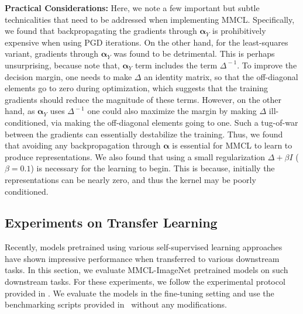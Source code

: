 \documentclass[letterpaper]{article} \usepackage{aaai22}  \usepackage{times}  \usepackage{helvet}  \usepackage{courier}  \usepackage[hyphens]{url}  \usepackage{graphicx} \urlstyle{rm} \def\UrlFont{\rm}  \usepackage{natbib}  \usepackage{caption} \DeclareCaptionStyle{ruled}{labelfont=normalfont,labelsep=colon,strut=off} \frenchspacing  \setlength{\pdfpagewidth}{8.5in}  \setlength{\pdfpageheight}{11in}
\newcommand{\valpha}{\bm{\alpha}}
\newcommand{\inv}[1]{{#1}^{\!-\!1}}
\begin{document}
\noindent\textbf{Practical Considerations:}
Here, we note a few important but subtle technicalities that need to be addressed when implementing MMCL. Specifically, we found that backpropagating the gradients through $\valpha_Y$ is prohibitively expensive when using PGD iterations. On the other hand, for the least-squares variant, gradients through $\valpha_Y$ was found to be detrimental. This is perhaps unsurprising, because note that, $\valpha_Y$ term includes the term $\inv{\Delta}$. To improve the decision margin, one needs to make $\Delta$ an identity matrix, so that the off-diagonal elements go to zero during optimization, which suggests that the training gradients should reduce the magnitude of these terms. However, on the other hand, as $\valpha_Y$ uses $\inv{\Delta}$ one could also maximize the margin by making $\Delta$ ill-conditioned, via making the off-diagonal elements going to one. Such a tug-of-war between the gradients can essentially destabilize the training. Thus, we found that avoiding any backpropagation through $\valpha$ is essential for MMCL to learn to produce representations. We also found that using a small regularization $\Delta+\beta I$ ($\beta=0.1$) is necessary for the learning to begin. This is because, initially the representations can be nearly zero, and thus the kernel may be poorly conditioned.

\subsection{Experiments on Transfer Learning}
Recently, models pretrained using various self-supervised learning approaches have shown impressive performance when transferred to various downstream tasks. In this section, we evaluate MMCL-ImageNet pretrained models on such downstream tasks. For these experiments, we follow the experimental protocol provided in \cite{Ericsson2021HowTransfer}. We evaluate the models in the fine-tuning setting and use the benchmarking scripts provided in~\cite{Ericsson2021HowTransfer} without any modifications. 
\end{document}
